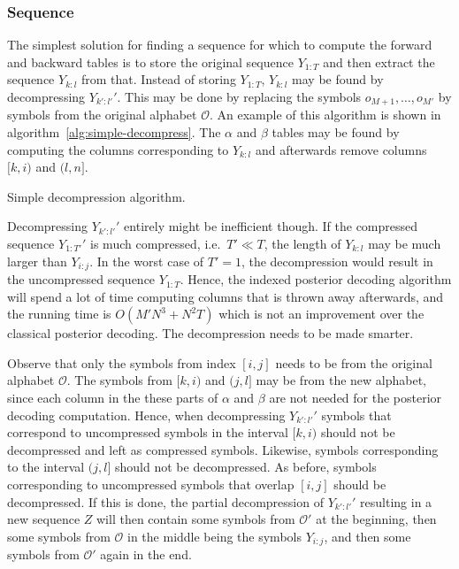 \subsubsection{Sequence}

The simplest solution for finding a sequence for which to compute the forward
and backward tables is to store the original sequence $Y_{1:T}$ and then
extract the sequence $Y_{k:l}$ from that. Instead of storing $Y_{1:T}$,
$Y_{k:l}$ may be found by decompressing $Y_{k':l'}'$. This may be done by
replacing the symbols $o_{M + 1}, \dots, o_{M'}$ by symbols from the original
alphabet $\mathcal{O}$. An example of this algorithm is shown in
algorithm~\ref{alg:simple-decompress}. The $\alpha$ and $\beta$ tables may be
found by computing the columns corresponding to $Y_{k:l}$ and afterwards remove
columns $[k, i)$ and $(l, n]$.

\begin{algorithm}
  \caption{Simple decompression algorithm.}
  \label{alg:simple-decompress}
  \begin{algorithmic}[1]
        \EndFor{}
    \EndProcedure{}
  \end{algorithmic}
\end{algorithm}

Decompressing $Y_{k':l'}'$ entirely might be inefficient though. If the
compressed sequence $Y_{1:T'}'$ is much compressed, i.e.\ $T' \ll T$, the
length of $Y_{k:l}$ may be much larger than $Y_{i:j}$. In the worst case of
$T' = 1$, the decompression would result in the uncompressed sequence
$Y_{1:T}$. Hence, the indexed posterior decoding algorithm will spend a lot of
time computing columns that is thrown away afterwards, and the running time is
$O(M' N^3 + N^2 T)$ which is not an improvement over the classical
posterior decoding. The decompression needs to be made smarter.

Observe that only the symbols from index $[i,j]$ needs to be from the original
alphabet $\mathcal{O}$. The symbols from $[k, i)$ and $(j, l]$ may be from the
new alphabet, since each column in the these parts of $\alpha$ and $\beta$ are
not needed for the posterior decoding computation. Hence, when decompressing
$Y_{k':l'}'$ symbols that correspond to uncompressed symbols in the interval
$[k, i)$ should not be decompressed and left as compressed symbols. Likewise,
symbols corresponding to the interval $(j, l]$ should not be decompressed. As
before, symbols corresponding to uncompressed symbols that overlap $[i, j]$
should be decompressed. If this is done, the partial decompression of
$Y_{k':l'}'$ resulting in a new sequence $Z$ will then contain some symbols
from $\mathcal{O'}$ at the beginning, then some symbols from $\mathcal{O}$ in
the middle being the symbols $Y_{i:j}$, and then some symbols from
$\mathcal{O'}$ again in the end.


